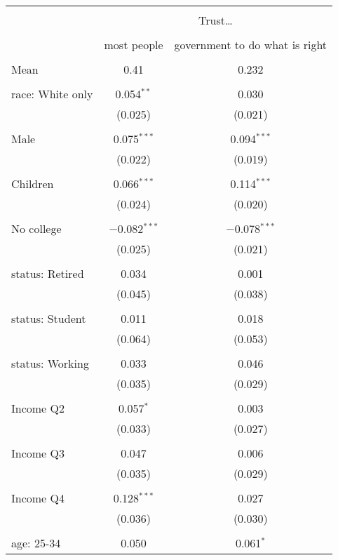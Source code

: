 
\begin{tabular}{@{\extracolsep{5pt}}lcc} 
\\[-1.8ex]\hline 
\hline \\[-1.8ex] 
 & \multicolumn{2}{c}{Trust…} \\ 
\cline{2-3} 
\\[-1.8ex] & most people & government to do what is right \\ 
\hline \\[-1.8ex] 
 Mean & 0.41 & 0.232  \\ \hline \\[-1.8ex] race: White only & 0.054$^{**}$ & 0.030 \\ 
  & (0.025) & (0.021) \\ 
  & & \\ 
 Male & 0.075$^{***}$ & 0.094$^{***}$ \\ 
  & (0.022) & (0.019) \\ 
  & & \\ 
 Children & 0.066$^{***}$ & 0.114$^{***}$ \\ 
  & (0.024) & (0.020) \\ 
  & & \\ 
 No college & $-$0.082$^{***}$ & $-$0.078$^{***}$ \\ 
  & (0.025) & (0.021) \\ 
  & & \\ 
 status: Retired & 0.034 & 0.001 \\ 
  & (0.045) & (0.038) \\ 
  & & \\ 
 status: Student & 0.011 & 0.018 \\ 
  & (0.064) & (0.053) \\ 
  & & \\ 
 status: Working & 0.033 & 0.046 \\ 
  & (0.035) & (0.029) \\ 
  & & \\ 
 Income Q2 & 0.057$^{*}$ & 0.003 \\ 
  & (0.033) & (0.027) \\ 
  & & \\ 
 Income Q3 & 0.047 & 0.006 \\ 
  & (0.035) & (0.029) \\ 
  & & \\ 
 Income Q4 & 0.128$^{***}$ & 0.027 \\ 
  & (0.036) & (0.030) \\ 
  & & \\ 
 age: 25-34 & 0.050 & 0.061$^{*}$ \\ 

\end{tabular}
